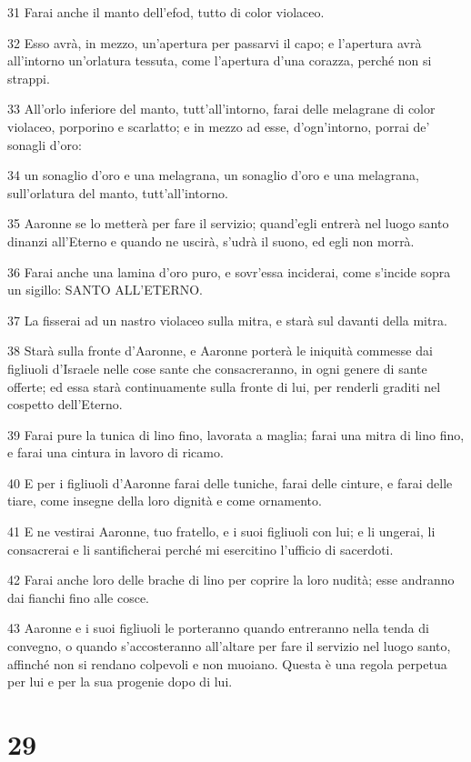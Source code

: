 \par 31 Farai anche il manto dell'efod, tutto di color violaceo.
\par 32 Esso avrà, in mezzo, un'apertura per passarvi il capo; e l'apertura avrà all'intorno un'orlatura tessuta, come l'apertura d'una corazza, perché non si strappi.
\par 33 All'orlo inferiore del manto, tutt'all'intorno, farai delle melagrane di color violaceo, porporino e scarlatto; e in mezzo ad esse, d'ogn'intorno, porrai de' sonagli d'oro:
\par 34 un sonaglio d'oro e una melagrana, un sonaglio d'oro e una melagrana, sull'orlatura del manto, tutt'all'intorno.
\par 35 Aaronne se lo metterà per fare il servizio; quand'egli entrerà nel luogo santo dinanzi all'Eterno e quando ne uscirà, s'udrà il suono, ed egli non morrà.
\par 36 Farai anche una lamina d'oro puro, e sovr'essa inciderai, come s'incide sopra un sigillo: SANTO ALL'ETERNO.
\par 37 La fisserai ad un nastro violaceo sulla mitra, e starà sul davanti della mitra.
\par 38 Starà sulla fronte d'Aaronne, e Aaronne porterà le iniquità commesse dai figliuoli d'Israele nelle cose sante che consacreranno, in ogni genere di sante offerte; ed essa starà continuamente sulla fronte di lui, per renderli graditi nel cospetto dell'Eterno.
\par 39 Farai pure la tunica di lino fino, lavorata a maglia; farai una mitra di lino fino, e farai una cintura in lavoro di ricamo.
\par 40 E per i figliuoli d'Aaronne farai delle tuniche, farai delle cinture, e farai delle tiare, come insegne della loro dignità e come ornamento.
\par 41 E ne vestirai Aaronne, tuo fratello, e i suoi figliuoli con lui; e li ungerai, li consacrerai e li santificherai perché mi esercitino l'ufficio di sacerdoti.
\par 42 Farai anche loro delle brache di lino per coprire la loro nudità; esse andranno dai fianchi fino alle cosce.
\par 43 Aaronne e i suoi figliuoli le porteranno quando entreranno nella tenda di convegno, o quando s'accosteranno all'altare per fare il servizio nel luogo santo, affinché non si rendano colpevoli e non muoiano. Questa è una regola perpetua per lui e per la sua progenie dopo di lui.

\chapter{29}

